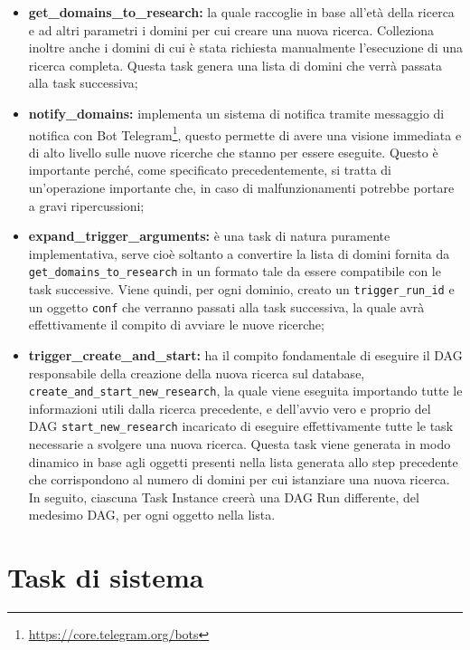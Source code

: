 \begin{itemize}
  \item \textbf{get\_domains\_to\_research:} la quale raccoglie in base all'età
    della ricerca e ad altri parametri i domini per cui creare una nuova ricerca.
    Colleziona inoltre anche i domini di cui è stata richiesta manualmente l'esecuzione
    di una ricerca completa. Questa task genera una lista di domini che verrà
    passata alla task successiva;

  \item \textbf{notify\_domains:} implementa un sistema di notifica tramite
    messaggio di notifica con Bot Telegram\footnote{\url{https://core.telegram.org/bots}},
    questo permette di avere una visione immediata e di alto livello sulle nuove
    ricerche che stanno per essere eseguite. Questo è importante perché, come
    specificato precedentemente, si tratta di un'operazione importante che, in
    caso di malfunzionamenti potrebbe portare a gravi ripercussioni;

  \item \textbf{expand\_trigger\_arguments:} è una task di natura puramente
    implementativa, serve cioè soltanto a convertire la lista di domini fornita da
    \texttt{get\_domains\_to\_research} in un formato tale da essere compatibile
    con le task successive. Viene quindi, per ogni dominio, creato un \texttt{trigger\_run\_id}
    e un oggetto \texttt{conf} che verranno passati alla task successiva, la
    quale avrà effettivamente il compito di avviare le nuove ricerche;

  \item \textbf{trigger\_create\_and\_start:} ha il compito fondamentale di
    eseguire il DAG responsabile della creazione della nuova ricerca sul
    database, \texttt{create\_and\_start\_new\_research}, la quale viene eseguita
    importando tutte le informazioni utili dalla ricerca precedente, e dell'avvio
    vero e proprio del DAG \texttt{start\_new\_research} incaricato di eseguire effettivamente
    tutte le task necessarie a svolgere una nuova ricerca. Questa task viene
    generata in modo dinamico in base agli oggetti presenti nella lista generata
    allo step precedente che corrispondono al numero di domini per cui
    istanziare una nuova ricerca. In seguito, ciascuna Task Instance creerà una
    DAG Run differente, del medesimo DAG, per ogni oggetto nella lista.
\end{itemize}

\section{Task di sistema}
\label{sec:sistema}

